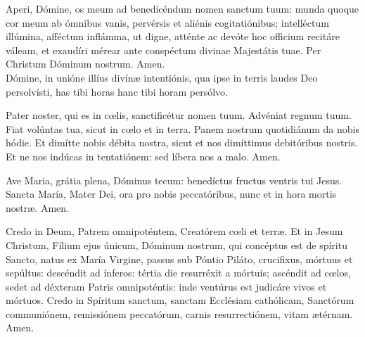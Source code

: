 \documentclass[nocturnale-dominicis.tex]{subfiles}
\begin{document}

\begin{multicols}{2}
Aperi, Dómine, os meum ad benedicéndum nomen sanctum tuum: munda quoque cor meum ab ómnibus vanis, pervérsis et aliénis 
cogitatiónibus; intelléctum illúmina, afféctum inflámma, ut digne, atténte ac devóte hoc officium recitáre váleam, et exaudíri mérear
ante conspéctum divinae Majestátis tuae. Per Christum Dóminum nostrum. Amen.\\

Dómine, in unióne illíus divínæ intentiónis, qua ipse in terris laudes Deo persolvísti, has tibi horas  hanc tibi horam\rubric{)} persólvo.
\end{multicols}
\begin{multicols}{2}
Pater noster, qui es in cœlis, sanctificétur nomen tuum. Advéniat regnum tuum. Fiat volúntas tua, sicut in cœlo et in terra.
Panem nostrum quotidiánum da nobis hódie. Et dimítte nobis débita nostra, sicut et nos dimíttimus debitóribus nostris. Et ne nos
indúcas in tentatiónem: sed líbera nos a malo. Amen.

Ave Maria, grátia plena, Dóminus tecum: benedíctus fructus ventris tui Jesus. Sancta María, Mater Dei, ora pro nobis 
peccatóribus, nunc et in hora mortis nostræ. Amen.

Credo in Deum, Patrem omnipoténtem, Creatórem cœli et terræ. Et in Jesum Christum, Fílium ejus únicum, Dóminum nostrum,
qui concéptus est de spíritu Sancto, natus ex María Virgine, passus sub Póntio Piláto, crucifixus, mórtuus et sepúltus: descéndit
ad ínferos: tértia die resurréxit a mórtuis; ascéndit ad cœlos, sedet ad déxteram Patris omnipoténtis: inde ventúrus est judicáre
vivos et mórtuos. Credo in Spíritum sanctum, sanctam Ecclésiam cathólicam, Sanctórum communiónem, remissiónem peccatórum,
carnis resurrectiónem, vitam ætérnam. Amen.
\end{multicols}

\end{document}
